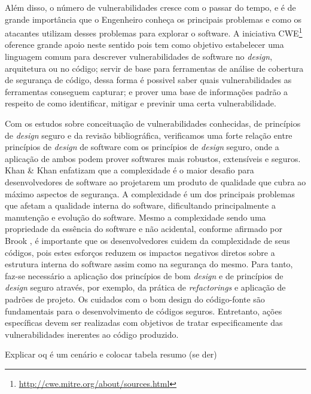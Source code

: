 Além disso, o número de vulnerabilidades cresce com o passar do tempo, e é de grande importância que o Engenheiro conheça os principais problemas e como os atacantes utilizam desses problemas para explorar o software. A iniciativa CWE\footnote{\url{http://cwe.mitre.org/about/sources.html}} oference grande apoio neste sentido pois tem como objetivo estabelecer uma linguagem comum para descrever vulnerabilidades de software no \emph{design}, arquitetura ou no código; servir de base para ferramentas de análise de cobertura de segurança de código, dessa forma é possivel saber quais vulnerabilidades as ferramentas conseguem capturar; e prover uma base de informações padrão a respeito de como identificar, mitigar e previnir uma certa vulnerabilidade.


Com os estudos sobre conceituação de vulnerabilidades conhecidas, de princípios de \emph{design} seguro e da revisão bibliográfica, verificamos uma forte relação entre princípios de \emph{design} de software com os princípios de \emph{design} seguro, onde a aplicação de ambos podem prover softwares mais robustos, extensíveis e seguros. 
%
Khan \& Khan \cite{khan2010} enfatizam que a complexidade é o maior desafio para desenvolvedores de software ao projetarem um produto de qualidade que cubra ao máximo aspectos de segurança. A complexidade é um dos principais problemas que afetam a qualidade interna do software, dificultando principalmente a manutenção e evolução do software.
%
Mesmo a complexidade sendo uma propriedade da essência do software e não acidental, conforme afirmado por Brook \cite{brooks1986}, é importante que os desenvolvedores cuidem da complexidade de seus códigos, pois estes esforços reduzem os impactos negativos diretos sobre a estrutura interna do software assim como na segurança do mesmo. Para tanto, faz-se necessário a aplicação dos princípios de bom \emph{design} e de princípios de \emph{design} seguro através, por exemplo, da prática de \emph{refactorings} e aplicação de padrões de projeto.
%
Os cuidados com o bom design do código-fonte são fundamentais para o desenvolvimento de códigos seguros. Entretanto, ações específicas devem ser realizadas com objetivos de tratar especificamente das vulnerabilidades inerentes ao código produzido.



Explicar oq é um cenário e colocar tabela resumo (se der)


